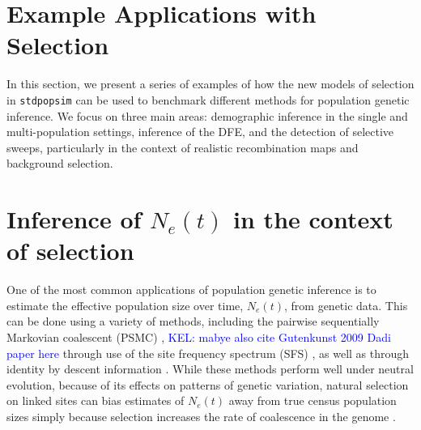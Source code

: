 \documentclass[hidelinks]{article}
\newcommand{\stdpopsim}{\texttt{stdpopsim}\xspace}
\newcommand{\kelcomment}[1]{\textcolor{blue}{KEL: #1}}
\begin{document}
    
\section*{Example Applications with Selection}
    \label{applications}
    In this section, we present a series of examples of how the new models of selection
    in \stdpopsim can be used to benchmark different
    methods for population genetic inference.
    We focus on three main areas: demographic inference in the 
    single and multi-population settings, inference of the DFE,
    and the detection of selective sweeps, particularly in the context of realistic recombination maps and background selection.

    \section*{Inference of $N_e(t)$ in the context of selection}
    One of the most common applications of population genetic inference is to estimate
    the effective population size over time, $N_e(t)$, from genetic data. This can be done
    using a variety of methods, including the pairwise sequentially Markovian coalescent
    (PSMC) \citep{li2011inference}, \kelcomment{mabye also cite Gutenkunst 2009 Dadi paper here} through use of the site frequency spectrum (SFS) \citep{liu2020stairway},
    as well as through identity by descent information \citep{santiago2020recent}. 
    While these methods perform well under neutral evolution, because of its effects on
    patterns of genetic variation, natural selection on linked sites can bias estimates of $N_e(t)$
    away from true census population sizes simply because selection increases the 
    rate of coalescence in the genome \citep[e.g.][]{schrider2016effects}. 
\end{document}
